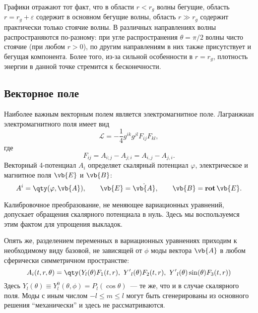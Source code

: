 \documentclass[\docroot/reports/draft/report.tex]{subfiles}
\begin{document}
        Графики отражают тот факт, что в области $r < r_g$ волны бегущие, область $r = r_g + \varepsilon$ содержит в основном бегущие волны, область $r \gg r_g$ содержит практически только стоячие волны. В различных направлениях волны распространяются по-разному: при угле распространения $\theta = \pi/2$ волны чисто стоячие (при любом $r > 0$), по другим направлениям в них также присутствует и бегущая компонента. Более того, из-за сильной особенности в $r = r_g$, плотность энергии в данной точке стремится к бесконечности.

\subsection{Векторное поле}

    Наиболее важным векторным полем является электромагнитное поле. Лагранжиан электромагнитного поля имеет вид
    \begin{equation*}
        \mathcal{L} = - \frac{1}{4} g^{ik} g^{jl} F_{ij} F_{kl} ,
    \end{equation*}
    где
    \begin{equation*}
        F_{ij} = A_{i;j} - A_{j;i} = A_{i,j} - A_{j,i} .
    \end{equation*}
    Векторный 4-потенциал $A_i$ определяет скалярный потенциал $\varphi$, электрическое и магнитное поля $\vb{E}$ и $\vb{B}$:
    \begin{equation*}
        A^i = \qty(\varphi, \vb{A}), \qquad
        \vb{E} = \dot{\vb{A}}, \qquad
        \vb{B} = \mathop{\mathbf{rot}}{\vb{E}} .
    \end{equation*}

    Калибровочное преобразование, не меняющее вариационных уравнений, допускает обращения скалярного потенциала в нуль. Здесь мы воспользуемся этим фактом для упрощения выкладок.

    Опять же, разделением переменных в вариационных уравнениях приходим к необходимому виду базовой, не зависящей от $\phi$ моды вектора $\vb{A}$ в любом сферически симметричном пространстве:
    \begin{equation*}
        A_i(t,r,\theta) = \qty(Y_l(\theta) F_1(t,r),\ {Y'}_l(\theta) F_2(t,r),\ {Y'}_l(\theta) \sin(\theta) F_3(t,r))
    \end{equation*}
    Здесь $Y_l(\theta) \equiv Y_l^0(\theta,\phi) = P_l(\cos\theta)$~--- те же, что и в случае скалярного поля. Моды с иным числом $-l \le m \le l$ могут быть сгенерированы из основного решения \enquote{механически} и здесь не рассматриваются.
\end{document}
